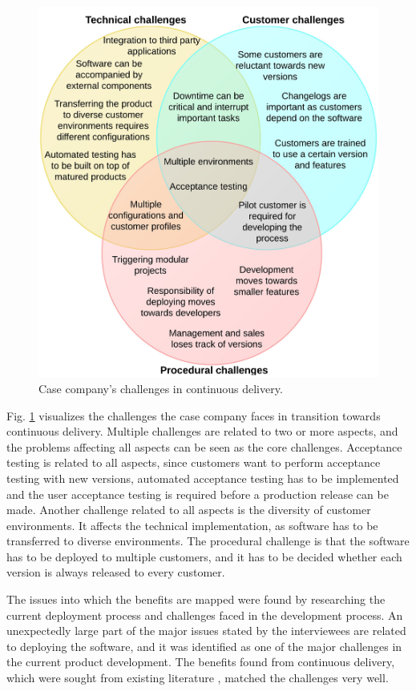 \documentclass[lnbip]{svmultln}
\begin{document}
\begin{figure}[!htb]
  \centering
  \includegraphics[width=5.0in]{cd_challenges.jpeg}
  \caption{Case company's challenges in continuous delivery.}
  \label{fig1}
\end{figure}

Fig. \ref{fig1} visualizes the challenges the case company faces in transition towards continuous delivery. Multiple challenges are related to two or more aspects, and the problems affecting all aspects can be seen as the core challenges. Acceptance testing is related to all aspects, since customers want to perform acceptance testing with new versions, automated acceptance testing has to be implemented and the user acceptance testing is required before a production release can be made. Another challenge related to all aspects is the diversity of customer environments. It affects the technical implementation, as software has to be transferred to diverse environments. The procedural challenge is that the software has to be deployed to multiple customers, and it has to be decided whether each version is always released to every customer. 

The issues into which the benefits are mapped were found by researching the current deployment process and challenges faced in the development process. An unexpectedly large part of the major issues stated by the interviewees are related to deploying the software, and it was identified as one of the major challenges in the current product development. The benefits found from continuous delivery, which were sought from existing literature \cite{cdbook, neely2013continuous, humble2006deployment}, matched the challenges very well. 
\end{document}
